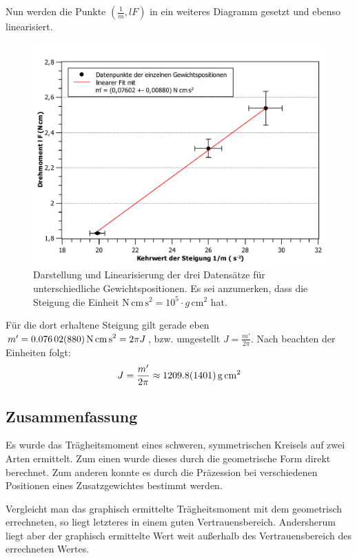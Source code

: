 	Nun werden die Punkte $(\frac{1}{m}, lF)$ in ein weiteres Diagramm gesetzt und ebenso linearisiert.
	\begin{figure}[ht]
		\centering
		\includegraphics[width=\textwidth]{kreisel_gewichte.pdf}
		\caption{Darstellung und Linearisierung der drei Datensätze für unterschiedliche Gewichtspositionen. Es sei anzumerken, dass die Steigung die Einheit $\si{\newton\,\centi\meter\,\second\squared} = 10^5\cdot \si{g\,\centi\meter^2}$ hat.}
		\label{abb:gewichte}	
	\end{figure}
	Für die dort erhaltene Steigung gilt gerade eben $m' = \SI{0,07602 +- 0,00880}{\newton\,\centi\meter\,\second\squared} = 2\pi J$, bzw. umgestellt $J = \frac{m'}{2\pi}$.
	Nach beachten der Einheiten folgt:
	\begin{equation}
		J = \frac{m'}{2\pi} \approx \SI{1209,8 +- 140,1}{g\,\centi\meter\squared}
	\end{equation}
	

\subsection{Zusammenfassung}

Es wurde das Trägheitsmoment eines schweren, symmetrischen Kreisels auf zwei Arten ermittelt.
Zum einen wurde dieses durch die geometrische Form direkt berechnet.
Zum anderen konnte es durch die Präzession bei verschiedenen Positionen eines Zusatzgewichtes bestimmt werden.

Vergleicht man das graphisch ermittelte Trägheitsmoment mit dem geometrisch errechneten, so liegt letzteres in einem guten Vertrauensbereich.
Andersherum liegt aber der graphisch ermittelte Wert weit außerhalb des Vertrauensbereich des errechneten Wertes.


